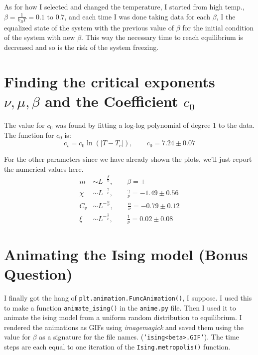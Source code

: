 \documentclass[12pt, a4paper]{article}
\begin{document}
	As for how I selected and changed the temperature, I started from high temp., 
	$\beta =\frac{1}{k_B T} = 0.1$ to $0.7$, and each time I was done taking data for each 
	$\beta$, I the equalized state of the system with the previous value of $\beta$ for the initial 
	condition of the system with new $\beta$. This way the necessary time to reach equilibrium is decreased and so is the risk of the system freezing.
	
	\section{Finding the critical exponents $\nu, \mu, \beta$ and the Coefficient $c_0$}
	The value for $c_0$ was found by fitting a log-log polynomial of degree 1 to the data. The function for $c_0$ is:
	\begin{equation}
		c_v = c_0 \ln(|T - T_c|), \qquad c_0 = 7.24 \pm 0.07
	\end{equation}
	
	For the other parameters since we have already shown the plots, we'll just report the numerical values here.
	\begin{equation}
	\begin{aligned}	
		m &\sim L^{-\frac{\beta}{\nu}}, \qquad \beta = \pm \\
		\chi &\sim L^{-\frac{\gamma}{\nu}}, \qquad \frac{\gamma}{\nu} = - 1.49 \pm 0.56\\
		C_v &\sim L^{-\frac{\alpha}{\nu}}, \qquad \frac{\alpha}{\nu} = - 0.79 \pm 0.12\\
		\xi & \sim L^{-\frac{1}{\nu}}, \qquad \frac{1}{\nu} = 0.02\pm 0.08
	\end{aligned}
	\end{equation}

	\section{Animating the Ising model (Bonus Question)}
	I finally got the hang of \texttt{plt.animation.FuncAnimation()}, I suppose. I used this to make a function \texttt{animate\_ising()} in 
	the \texttt{anime.py} file. Then I used it to animate the ising model from a uniform random distribution to equilibrium. I rendered the animations as GIFs using \emph{imagemagick} and saved them using the value for $\beta$ as a signature for the file names. 
	(\texttt{'ising<beta>.GIF'}). The time steps are each equal to one iteration of the \texttt{Ising.metropolis()} function.
\end{document}
